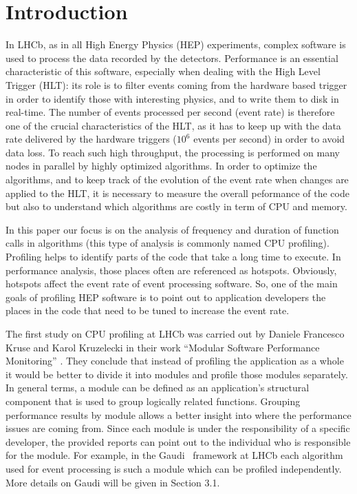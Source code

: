 \documentclass[a4paper]{jpconf}
\begin{document}
\section{Introduction}
In LHCb, as in all High Energy Physics (HEP) experiments, complex software is used to process the data recorded 
by the detectors. Performance is an essential characteristic of this software, especially when dealing with 
the High Level Trigger (HLT): its role is to filter events coming from the hardware based trigger in order to identify 
those with interesting physics, and to write them to disk in real-time. The number of events processed per 
second (event rate) is therefore one of the crucial characteristics of the HLT, as it has to keep up with the data rate 
delivered by the hardware triggers ($10^6$ events per second) in order to avoid data loss. To reach such high 
throughput, the processing is performed on many nodes in parallel by highly optimized algorithms. In order to optimize 
the algorithms, and to keep track of the evolution of the event rate when changes are applied to the HLT, it is 
necessary to measure the overall peformance of the code but also to understand which algorithms are costly in term of 
CPU and memory.

In this paper our focus is on the analysis of frequency and duration of function calls in algorithms (this type of 
analysis is commonly named CPU profiling). Profiling helps to identify parts of the code that take a long time to 
execute. In performance analysis, those places often are referenced as hotspots. Obviously,  hotspots affect the event 
rate of event processing software. So, one of the main goals of profiling HEP software is to point out to application 
developers the places in the code that need to be tuned to increase the event rate.

The first study on CPU profiling at LHCb was carried out by Daniele Francesco Kruse and Karol Kruzelecki in their work 
“Modular Software Performance Monitoring” \cite{modular}. They conclude that instead of profiling 
the application as a whole it would be better to divide it into modules and profile those modules separately. 
In general terms, a module can be defined as an application’s structural component that is used to group logically 
related functions.  Grouping performance results by module allows a better insight into where the performance 
issues are coming from. Since each module is under the responsibility of a specific developer,  the provided reports 
can point out to the individual who is responsible for the module. For example, in the Gaudi~\cite{gaudi} 
framework at LHCb each algorithm used for event processing is such a module which can be profiled independently. 
More details on Gaudi will be given in Section 3.1. 
\end{document}
